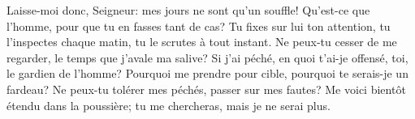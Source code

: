 Laisse-moi donc, Seigneur: mes jours ne sont qu’un souffle!
Qu’est-ce que l’homme, pour que tu en fasses tant de cas?
Tu fixes sur lui ton attention,
	tu l’inspectes chaque matin, tu le scrutes à tout instant.
Ne peux-tu cesser de me regarder, le temps que j’avale ma salive?
Si j’ai péché, en quoi t’ai-je offensé, toi, le gardien de l’homme?
Pourquoi me prendre pour cible, pourquoi te serais-je un fardeau?
Ne peux-tu tolérer mes péchés, passer sur mes fautes?
Me voici bientôt étendu dans la poussière;
	tu me chercheras, mais je ne serai plus.

